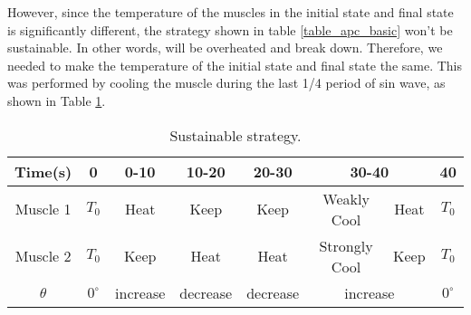 However, since the temperature of the muscles in the initial state and final state is significantly different, the strategy shown in table \ref{table_apc_basic} won't be sustainable. In other words, \scps will be overheated and break down.
Therefore, we needed to make the temperature of the initial state and final state the same. This was performed by cooling the muscle during the last 1/4 period of sin wave, as shown in Table \ref{table_apc_sustain}.

\begin{table}[t]
	\caption{Sustainable \apc strategy.}
	\label{table_apc_sustain}
	\begin{center}
		\begin{tabular}{c||c|c|c|c|c|c|c}
			\hline
			Time(s) & 0 & 0-10 & 10-20 & 20-30 & \multicolumn{2}{|c|}{30-40} & 40 \\
			\hline
			Muscle 1 & $T_0$ & Heat & Keep & Keep & Weakly Cool & Heat & $T_0$ \\
			Muscle 2 & $T_0$ & Keep & Heat & Heat & Strongly Cool & Keep & $T_0$ \\
			\hline
			$\theta$ & $0^{\circ}$ & increase & decrease & decrease & \multicolumn{2}{|c|}{increase} & $0^{\circ}$ \\
			\hline
		\end{tabular}
	\end{center}
\end{table}